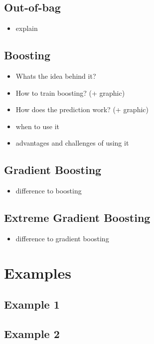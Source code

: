 \subsection{Out-of-bag}
\begin{itemize}
    \item explain
\end{itemize}

\subsection{Boosting}
\begin{itemize}
    \item Whats the idea behind it?
    \item How to train boosting? (+ graphic)
    \item How does the prediction work? (+ graphic)
    \item when to use it
    \item advantages and challenges of using it
\end{itemize}

\subsection{Gradient Boosting}
\begin{itemize}
    \item difference to boosting
\end{itemize}

\subsection{Extreme Gradient Boosting}
\begin{itemize}
    \item difference to gradient boosting
\end{itemize}


\section{Examples}
\subsection{Example 1}
\subsection{Example 2}

